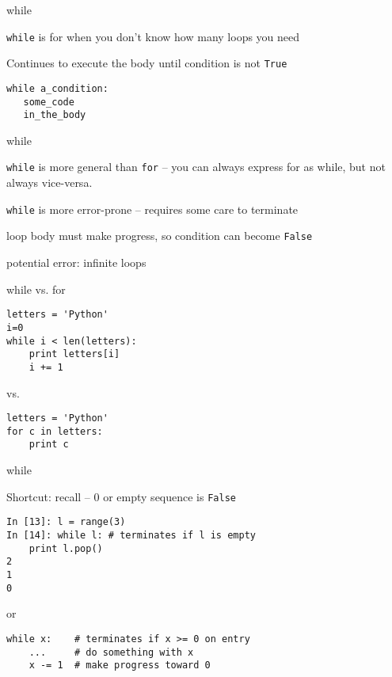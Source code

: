 \documentclass{beamer}
\begin{document}
\begin{frame}[fragile]{while}

{\Large \verb|while| is for when you don't know how many loops you need}

\vfill
{\Large Continues to execute the body until condition is not \verb|True|}

\begin{verbatim}
while a_condition:
   some_code
   in_the_body
\end{verbatim}
\end{frame}



\begin{frame}[fragile]{while}

{\Large \verb|while| is more general than \verb|for| -- 
you can always express for as while,
but not always vice-versa.}

\vfill

{\Large \verb|while| is more error-prone -- requires some care to terminate}

\vfill
{\Large  loop body must make progress, so condition can become \verb|False| }

\vfill
{\Large  potential error: infinite loops }
\end{frame}



\begin{frame}[fragile]{while vs. for}

\begin{verbatim}
letters = 'Python'
i=0
while i < len(letters):
    print letters[i]
    i += 1
\end{verbatim}
vs.
\begin{verbatim}
letters = 'Python'
for c in letters:
    print c
\end{verbatim}

\end{frame}


\begin{frame}[fragile]{while}

{\Large Shortcut: recall -- 0 or empty sequence is \verb|False| }

\vfill
\begin{verbatim}
In [13]: l = range(3)
In [14]: while l: # terminates if l is empty
    print l.pop()
2
1
0
\end{verbatim}
or
\begin{verbatim}
while x:    # terminates if x >= 0 on entry
    ...     # do something with x
    x -= 1  # make progress toward 0
\end{verbatim}

\end{frame}
\end{document}
